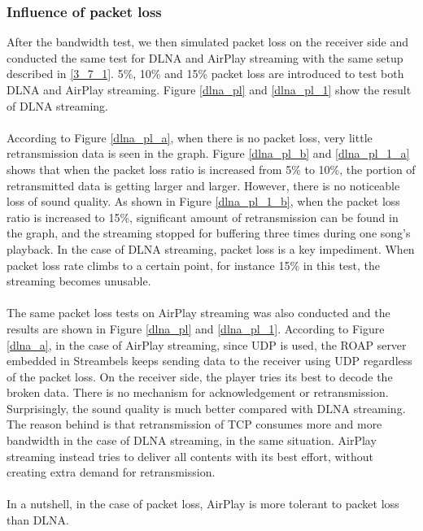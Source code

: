 \subsubsection{Influence of packet loss\label{4_1_3}}
After the bandwidth test, we then simulated packet loss on the receiver side and
conducted the same test for DLNA and AirPlay streaming with the same setup
described in \ref{3_7_1}. 5\%, 10\% and 15\% packet loss are introduced to test both DLNA and AirPlay streaming. Figure \ref{dlna_pl} and \ref{dlna_pl_1} show the result of DLNA streaming.\\
\\
According to Figure \ref{dlna_pl_a}, when there is no packet loss, very
little retransmission data is seen in the graph. Figure \ref{dlna_pl_b} and \ref{dlna_pl_1_a} shows that when the packet loss ratio is increased from 5\% to 10\%, the portion of retransmitted data is getting larger and larger. However, there is no noticeable loss of sound quality. As shown in Figure \ref{dlna_pl_1_b}, when the packet loss ratio is increased to 15\%, significant amount of retransmission can be found in the graph, and the streaming stopped for buffering three times during one song's playback. In the case of DLNA streaming, packet loss is a key impediment. When packet loss rate climbs to a certain point, for instance 15\% in this test, the streaming becomes unusable.\\
\\
The same packet loss tests on AirPlay streaming was also conducted and the
results are shown in Figure \ref{dlna_pl} and \ref{dlna_pl_1}. According
to Figure \ref{dlna_a}, in the case of AirPlay streaming, since UDP is used, the ROAP server embedded in Streambels keeps sending data to the receiver using UDP regardless of the packet loss. On the receiver side, the player tries its best to decode the broken data. There is no mechanism for acknowledgement or retransmission. Surprisingly, the sound quality is much better compared with DLNA streaming. The reason behind is that retransmission of TCP consumes more and more bandwidth in the case of DLNA streaming, in the same situation. AirPlay streaming instead tries to deliver all contents with its best effort, without creating extra demand for retransmission.\\
\\
In a nutshell, in the case of packet loss, AirPlay is more tolerant to packet loss than DLNA.
